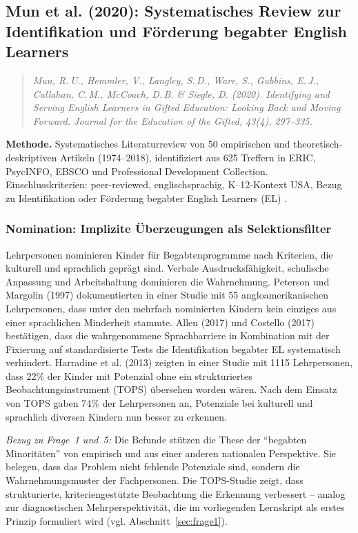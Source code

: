 \documentclass[ngerman, a4paper]{article}
\begin{document}
\subsection*{Mun et al. (2020): Systematisches Review zur Identifikation
  und Förderung begabter English Learners}
\label{subsec:mun2020}

\begin{quote}\itshape
Mun, R.\,U., Hemmler, V., Langley, S.\,D., Ware, S.,
Gubbins, E.\,J., Callahan, C.\,M., McCoach, D.\,B. \& Siegle, D.
(2020). Identifying and Serving English Learners in Gifted Education:
Looking Back and Moving Forward. \upshape Journal for the Education of
the Gifted, 43(4), 297--335.
\end{quote}

\textbf{Methode.} Systematisches Literaturreview von 50 empirischen und
theoretisch-deskriptiven Artikeln (1974--2018), identifiziert aus 625
Treffern in ERIC, PsycINFO, EBSCO und Professional Development Collection.
Einschlusskriterien: peer-reviewed, englischsprachig, K--12-Kontext USA,
Bezug zu Identifikation oder Förderung begabter English Learners (EL)
\parencite[S.\,302--304]{mun2020identifying}.

\subsubsection*{Nomination: Implizite Überzeugungen als Selektionsfilter}

Lehrpersonen nominieren Kinder für Begabtenprogramme nach Kriterien, die
kulturell und sprachlich geprägt sind. Verbale Ausdrucksfähigkeit,
schulische Anpassung und Arbeitshaltung dominieren die Wahrnehmung.
Peterson und Margolin (1997) dokumentierten in einer Studie mit 55
angloamerikanischen Lehrpersonen, dass unter den mehrfach nominierten
Kindern kein einziges aus einer sprachlichen Minderheit stammte. Allen
(2017) und Costello (2017) bestätigen, dass die wahrgenommene
Sprachbarriere in Kombination mit der Fixierung auf standardisierte Tests
die Identifikation begabter EL systematisch verhindert. Harradine et al.
(2013) zeigten in einer Studie mit 1115 Lehrpersonen, dass 22\% der
Kinder mit Potenzial ohne ein strukturiertes Beobachtungsinstrument (TOPS)
übersehen worden wären. Nach dem Einsatz von TOPS gaben 74\% der
Lehrpersonen an, Potenziale bei kulturell und sprachlich diversen Kindern
nun besser zu erkennen.

\textit{Bezug zu Frage~1 und~5:} Die Befunde stützen die These der
\enquote{begabten Minoritäten} von \textcite[S.\,576--585]{stamm2021fehlenderblick}
empirisch und aus einer anderen nationalen
Perspektive. Sie belegen, dass das Problem nicht fehlende Potenziale sind,
sondern die Wahrnehmungsmuster der Fachpersonen. Die TOPS-Studie zeigt,
dass strukturierte, kriteriengestützte Beobachtung die Erkennung
verbessert -- analog zur diagnostischen Mehrperspektivität, die im
vorliegenden Lernskript als erstes Prinzip formuliert wird
(vgl. Abschnitt~\ref{sec:frage1}).
\end{document}
